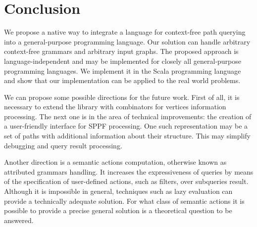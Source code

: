 \section{Conclusion}

We propose a native way to integrate a language for context-free path querying into a general-purpose programming language.
Our solution can handle arbitrary context-free grammars and arbitrary input graphs.
The proposed approach is language-independent and may be implemented for closely all general-purpose programming languages.
We implement it in the Scala programming language and show that our implementation can be applied to the real world problems.

We can propose some possible directions for the future work.
First of all, it is necessary to extend the library with combinators for vertices information processing.
The next one is in the area of technical improvements: the creation of a user-friendly interface for SPPF processing.
One such representation may be a set of paths with additional information about their structure.
This may simplify debugging and query result processing.

Another direction is a semantic actions computation, otherwise known as attributed grammars handling.
It increases the expressiveness of queries by means of the specification of user-defined actions, such as filters, over subqueries result. 
Although it is impossible in general, techniques such as lazy evaluation can provide a technically adequate solution.
For what class of semantic actions it is possible to provide a precise general solution is a theoretical question to be answered. 

